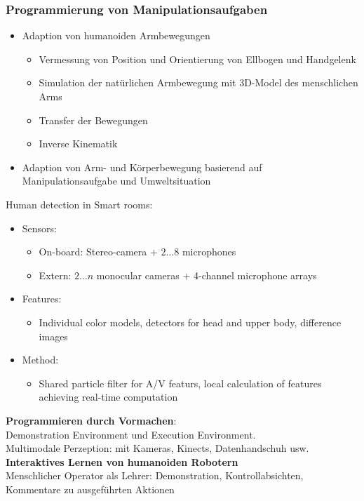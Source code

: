 \subsubsection{Programmierung von Manipulationsaufgaben}
\begin{itemize}
	\item Adaption von humanoiden Armbewegungen
	\begin{itemize}
		\item Vermessung von Position und Orientierung von Ellbogen und Handgelenk
		\item Simulation der natürlichen Armbewegung mit 3D-Model des menschlichen Arms
		\item Transfer der Bewegungen
		\item Inverse Kinematik
	\end{itemize}
	\item Adaption von Arm- und Körperbewegung basierend auf Manipulationsaufgabe und Umweltsituation
\end{itemize}
Human detection in Smart rooms:
\begin{itemize}
	\item Sensors:
	\begin{itemize}
		\item On-board: Stereo-camera + $2 \ldots 8$ microphones
		\item Extern: $2 \ldots n$ monocular cameras + 4-channel microphone arrays
	\end{itemize}
	\item Features:
	\begin{itemize}
		\item Individual color models, detectors for head and upper body, difference images
	\end{itemize}
	\item Method:
	\begin{itemize}
		\item Shared particle filter for A/V featurs, local calculation of features achieving real-time computation
	\end{itemize}
\end{itemize}
\textbf{Programmieren durch Vormachen}:\\
Demonstration Environment und Execution Environment. \\
Multimodale Perzeption: mit Kameras, Kinects, Datenhandschuh usw.\\
\textbf{Interaktives Lernen von humanoiden Robotern}\\
Menschlicher Operator als Lehrer: Demonstration, Kontrollabsichten, Kommentare zu ausgeführten Aktionen\\
